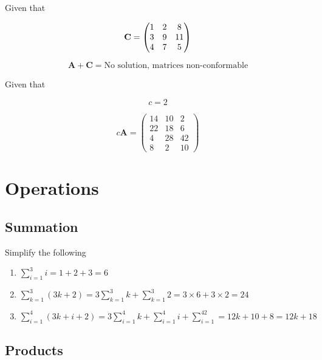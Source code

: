 \documentclass[
  letterpaper,
]{book}
\theoremstyle{definition}
\theoremstyle{definition}
\theoremstyle{plain}
\theoremstyle{definition}
\theoremstyle{plain}
\theoremstyle{plain}
\theoremstyle{remark}
\begin{document}
Given that

\[{\bf C}=\begin{pmatrix} 1 & 2 & 8 \\ 3 & 9 & 11 \\  4 & 7 & 5 \\ \end{pmatrix}\]

\[\mathbf{A} + \mathbf{C} = \text{No solution, matrices non-conformable}\]

Given that

\[c = 2\]

\[c\textbf{A} = \begin{pmatrix}
            14 & 10 & 2 \\
            22 & 18 & 6 \\ 
            4 & 28 & 42 \\ 
            8 & 2 & 10
        \end{pmatrix}\]

\hypertarget{operations-1}{%
\section*{Operations}\label{operations-1}}

\hypertarget{summation-2}{%
\subsection*{Summation}\label{summation-2}}

Simplify the following

\begin{enumerate}
\def\labelenumi{\arabic{enumi}.}
\item
  \(\sum\limits_{i = 1}^3 i = 1 + 2+ 3 = 6\)
\item
  \(\sum\limits_{k = 1}^3(3k + 2) = 3\sum\limits_{k=1}^3k + \sum\limits_{k=1}^3 2= 3\times 6 + 3\times 2 = 24\)
\item
  \(\sum\limits_{i= 1}^4 (3k + i + 2) = 3\sum\limits_{i= 1}^4k + \sum\limits_{i= 1}^4i + \sum\limits_{i= 1}^42 = 12k + 10 + 8 = 12k + 18\)
\end{enumerate}

\hypertarget{products-1}{%
\subsection*{Products}\label{products-1}}
\end{document}
